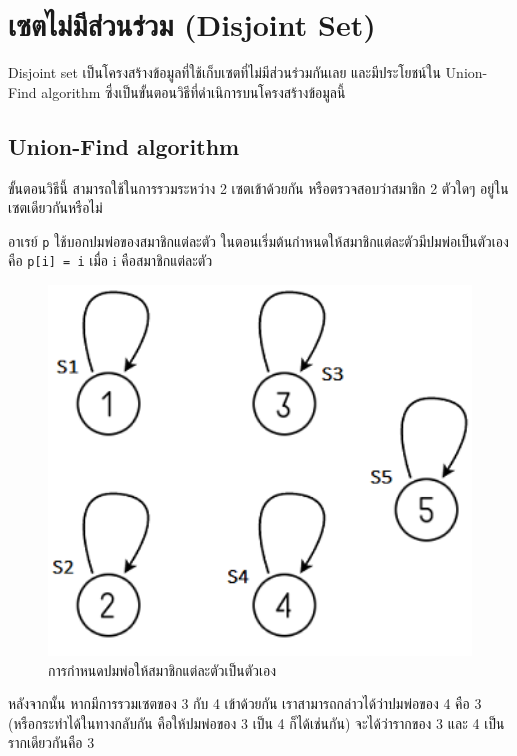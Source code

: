 \section{เซตไม่มีส่วนร่วม (Disjoint Set)}

Disjoint set เป็นโครงสร้างข้อมูลที่ใช้เก็บเซตที่ไม่มีส่วนร่วมกันเลย และมีประโยชน์ใน Union-Find algorithm ซึ่งเป็นขั้นตอนวิธีที่ดำเนิการบนโครงสร้างข้อมูลนี้

\subsection{Union-Find algorithm}

ขั้นตอนวิธีนี้ สามารถใช้ในการรวมระหว่าง 2 เซตเข้าด้วยกัน หรือตรวจสอบว่าสมาชิก 2 ตัวใดๆ อยู่ในเซตเดียวกันหรือไม่

อาเรย์ \texttt{p} ใช้บอกปมพ่อของสมาชิกแต่ละตัว ในตอนเริ่มต้นกำหนดให้สมาชิกแต่ละตัวมีปมพ่อเป็นตัวเอง คือ \texttt{p[i] = i} เมื่อ i คือสมาชิกแต่ละตัว

\begin{figure}[h!]
    \centering
    \includegraphics[width=13cm]{images/union-find-init}
    \caption{การกำหนดปมพ่อให้สมาชิกแต่ละตัวเป็นตัวเอง}
    \label{fig:union-find-init}
\end{figure}

\newpage

หลังจากนั้น หากมีการรวมเซตของ 3 กับ 4 เข้าด้วยกัน เราสามารถกล่าวได้ว่าปมพ่อของ 4 คือ 3 (หรือกระทำได้ในทางกลับกัน คือให้ปมพ่อของ 3 เป็น 4 ก็ได้เช่นกัน) จะได้ว่ารากของ 3 และ 4 เป็นรากเดียวกันคือ 3

